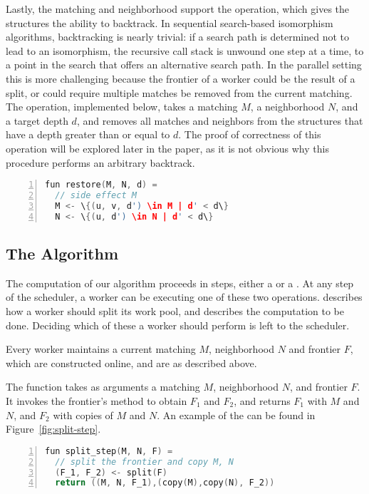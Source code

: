 Lastly, the matching and neighborhood support the
 operation, which gives the structures
the ability to backtrack.
%
In sequential search-based isomorphism algorithms, backtracking is
nearly trivial: if a search path is determined not to lead to an
isomorphism, the recursive call stack is unwound
one step at a time, to a point in the
search that offers an alternative search path.
%
In the parallel setting this is more challenging because
the frontier of a worker could be the result
of a split, or could require multiple matches
be removed from the current matching.
%
The  operation, implemented below, takes
a matching $M$, a neighborhood $N$, and a target depth $d$,
and removes all
matches and neighbors from the structures that have a depth
greater than or equal to $d$.
%
The proof of correctness of this operation will be
explored later in the paper, as it is not obvious why
this procedure performs an arbitrary backtrack.
%
\begin{lstlisting}[language=c, numbers=left]
fun restore(M, N, d) =
  // side effect M 
  M <- \{(u, v, d') \in M | d' < d\}
  N <- \{(u, d') \in N | d' < d\}
\end{lstlisting}


\subsection{The Algorithm}

The computation of our algorithm proceeds in steps,
either a  or a .
%
At any step of the scheduler, a worker can be
executing one of these two operations.
%
 describes how a worker should split
its work pool, and  describes
the computation to be done.
%
Deciding which of these a worker should perform is left
to the scheduler.

Every worker maintains a current matching $M$, neighborhood $N$
and frontier $F$, which are constructed online, and are as
described above.

The  function takes as arguments a matching $M$,
neighborhood $N$, and frontier $F$. It invokes the frontier's
 method to obtain $F_1$ and $F_2$, and returns $F_1$
with $M$ and $N$, and $F_2$ with copies of $M$ and $N$.
%
An example of the  can be found in Figure~\ref{fig:split-step}.
%
%
\begin{lstlisting}[language=c, numbers=left]
fun split_step(M, N, F) =
  // split the frontier and copy M, N 
  (F_1, F_2) <- split(F)
  return ((M, N, F_1),(copy(M),copy(N), F_2))
\end{lstlisting}

